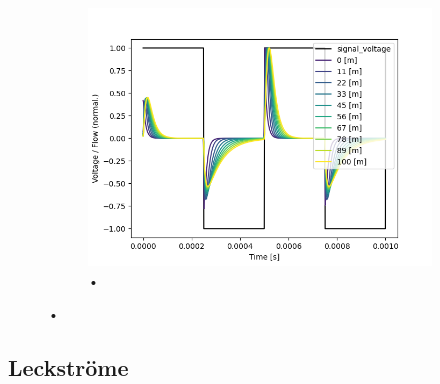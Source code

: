 \documentclass[fontsize=12pt, a4paper]{scrartcl}
\begin{document}
\begin{figure}[H]
\begin{subfigure}[H]{0.48\textwidth}
		\includegraphics[width=\textwidth, valign=t]{bilder/tubelength/tl_both_branch_multisweep_flow.png}
		\caption{•}
	\end{subfigure}
	\caption{•}
\end{figure}

\subsection{Leckströme}
\end{document}
